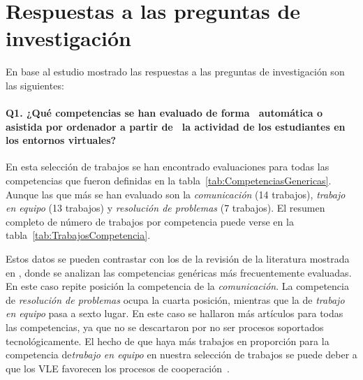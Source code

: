 \pagestyle{fancy}
\section{Respuestas a las preguntas de investigación}

En base al estudio mostrado las respuestas a las preguntas de investigación son las siguientes:

\paragraph*{Q1. ¿Qué competencias se han evaluado de forma \, automática o asistida por ordenador  a partir de  \, la actividad de los estudiantes en los entornos virtuales?}


En esta selección de trabajos se han encontrado evaluaciones para todas las competencias que fueron definidas en la tabla~\ref{tab:CompetenciasGenericas}. Aunque las que más se han evaluado son la \emph{comunicación} (14 trabajos), \emph{trabajo en equipo} (13 trabajos) y \emph{resolución de problemas} (7 trabajos). El resumen completo de número de trabajos por competencia puede verse en la tabla~\ref{tab:TrabajosCompetencia}.

Estos datos se pueden contrastar con los de la revisión de la literatura mostrada en \cite{strijbos2015criteria}, donde se analizan las competencias genéricas más frecuentemente evaluadas. En este caso repite posición la competencia de la \emph{comunicación}. La competencia de \emph{resolución de problemas} ocupa la cuarta posición, mientras que la de \emph{trabajo en equipo} pasa a sexto lugar. En este caso se hallaron más artículos para todas las competencias, ya que no se descartaron por no ser procesos soportados tecnológicamente. El hecho de que haya más trabajos en proporción para la competencia de\emph{trabajo en equipo} en nuestra selección de trabajos se puede deber a que los VLE favorecen los procesos de cooperación~\cite{i2007competencias}.


